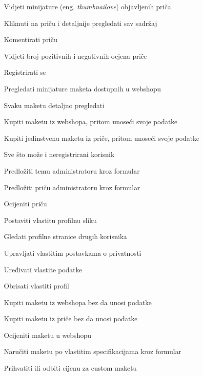			
			\begin{packed_enum}
				\item  {}
				
				\begin{packed_enum}
					
					\item Vidjeti minijature (eng. \textit{thumbnailove}) objavljenih priča
					\item Kliknuti na priču i detaljnije pregledati sav sadržaj
					\item Komentirati priču
					\item Vidjeti broj pozitivnih i negativnih ocjena priče
					\item Registrirati se
					\item Pregledati minijature maketa dostupnih u webshopu
					\item Svaku maketu detaljno pregledati
					\item Kupiti maketu iz webshopa, pritom unoseći svoje podatke
					\item Kupiti jedinstvenu maketu iz priče, pritom unoseći svoje podatke
				\end{packed_enum}
			
				\item  {}
				
				\begin{packed_enum}
					
					\item Sve što može i neregistrirani korisnik
					\item Predložiti temu administratoru kroz formular
					\item Predložiti priču administratoru kroz formular
					\item Ocijeniti priču
					\item Postaviti vlastitu profilnu sliku
					\item Gledati profilne stranice drugih korisnika
					\item Upravljati vlastitim postavkama o privatnosti
					\item Uređivati vlastite podatke
					\item Obrisati vlastiti profil
					\item Kupiti maketu iz webshopa bez da unosi podatke
					\item Kupiti maketu iz priče bez da unosi podatke
					\item Ocijeniti maketu u webshopu
					\item Naručiti maketu po vlastitim specifikacijama kroz formular
					\item Prihvatiti ili odbiti cijenu za custom maketu


\end{packed_enum}
\end{packed_enum}
